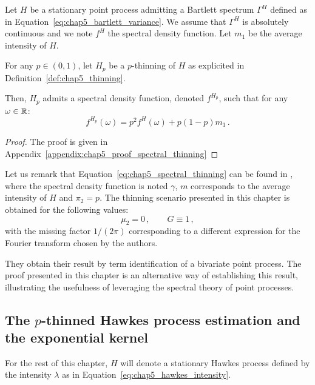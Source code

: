 \begin{proposition}\label{prop:chap5_spectral_thinning}
    Let $H$ be a stationary point process admitting a Bartlett spectrum $\Gamma^H$ defined as in Equation~\eqref{eq:chap5_bartlett_variance}.
    We assume that $\Gamma^H$ is absolutely continuous and we note $f^H$ the spectral density function. 
    Let $m_1$ be the average intensity of $H$.

    For any $p\in(0,1)$, let $H_p$ be a $p$-thinning of $H$ as explicited in Definition~\ref{def:chap5_thinning}.

    Then, $H_p$ admits a spectral density function, denoted $f^{H_p}$, such that for any $\omega\in{\mathbb R}$:
    \begin{equation}\label{eq:chap5_spectral_thinning}
        f^{H_p}(\omega) = p^2 f^H(\omega) + p(1-p)m_1\,.
    \end{equation}

\end{proposition}

\begin{proof}
    The proof is given in Appendix~\ref{appendix:chap5_proof_spectral_thinning}
\end{proof}

    Let us remark that Equation~\eqref{eq:chap5_spectral_thinning} can be found in \textcite[Equation 8.3.5]{DaleyV1},
    where the spectral density function is noted $\gamma$, $m$ corresponds to the average intensity of $H$ and $\pi_2 = p$.
    The thinning scenario presented in this chapter is obtained for the following values:
    \[\mu_2 = 0\,, \qquad G\equiv 1\,,\]
    with the missing factor $1/(2\pi)$ corresponding to a different expression for the Fourier transform chosen by the authors.

    They obtain their result by term identification of a bivariate point process. 
    The proof presented in this chapter is an alternative way of establishing this result,
    illustrating the usefulness of leveraging the spectral theory of point processes.


    \subsection{The $p$-thinned Hawkes process estimation and the exponential kernel}\label{sec:chap5_thinned_hawkes}

    For the rest of this chapter, 
    $H$ will denote a stationary Hawkes process defined by the intensity $\lambda$ as in Equation~\eqref{eq:chap5_hawkes_intensity}.

